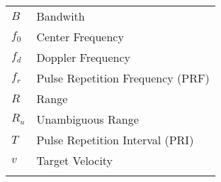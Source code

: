 \begin{longtable}{ p{}  p{} } 
$B$ & Bandwith \\
$f_0$ & Center Frequency \\
$f_d$ & Doppler Frequency \\
$f_r$ & Pulse Repetition Frequency (PRF) \\
$R$ & Range \\
$R_u$ & Unambiguous Range \\
$T$ & Pulse Repetition Interval (PRI) \\
$v$ & Target Velocity \\
\addlinespace[15pt]
\end{longtable}